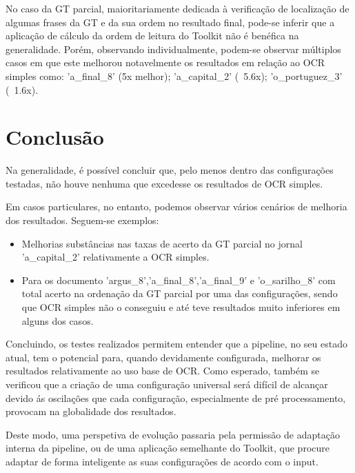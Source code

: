 No caso da GT parcial, maioritariamente dedicada à verificação de localização de algumas frases da GT e da sua ordem no resultado final, pode-se inferir que a aplicação de cálculo da ordem de leitura do Toolkit não é benéfica na generalidade. Porém, observando individualmente, podem-se observar múltiplos casos em que este melhorou notavelmente os resultados em relação ao OCR simples como: 'a\_final\_8' (5x melhor); 'a\_capital\_2' (~5.6x); 'o\_portuguez\_3' (~1.6x).



\section{Conclusão}

Na generalidade, é possível concluir que, pelo menos dentro das configurações testadas, não houve nenhuma que excedesse os resultados de OCR simples.

Em casos particulares, no entanto, podemos observar vários cenários de melhoria dos resultados.
Seguem-se exemplos:

\begin{itemize}
	\item Melhorias substâncias nas taxas de acerto da GT parcial no jornal 'a\_capital\_2' relativamente a OCR simples.
	
	\item Para os documento 'argus\_8','a\_final\_8','a\_final\_9' e 'o\_sarilho\_8' com total acerto na ordenação da GT parcial por uma das configurações, sendo que OCR simples não o conseguiu e até teve resultados muito inferiores em alguns dos casos.
	
\end{itemize}



Concluindo, os testes realizados permitem entender que a pipeline, no seu estado atual, tem o potencial para, quando devidamente configurada, melhorar os resultados relativamente ao uso base de OCR. Como esperado, também se verificou que a criação de uma configuração universal será difícil de alcançar devido ás oscilações que cada configuração, especialmente de pré processamento, provocam na globalidade dos resultados. 

Deste modo, uma perspetiva de evolução passaria pela permissão de adaptação interna da pipeline, ou de uma aplicação semelhante do Toolkit, que procure adaptar de forma inteligente as suas configurações de acordo com o input.




